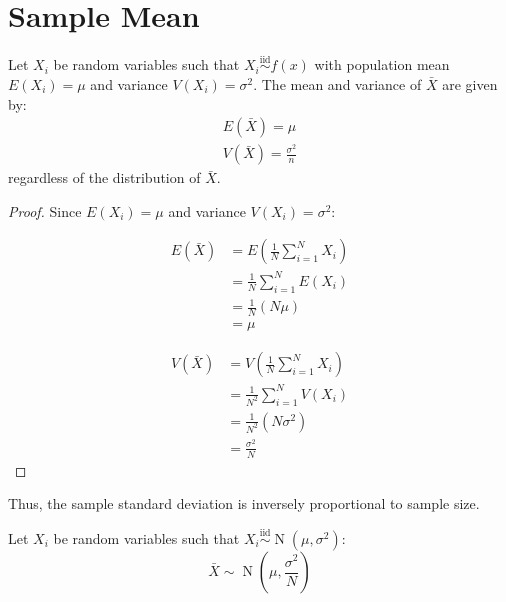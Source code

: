 \documentclass[letterpaper,12pt,fleqn]{article}
\newcommand{\iid}{\overset{\text{iid}}{\sim}}
\newcommand{\m}{\mu}
\renewcommand{\o}{\sigma}
\newcommand{\xb}{\bar{X}}
\DeclareMathOperator{\nd}{N}
\begin{document}
\section*{Sample Mean}

\begin{theorem}
  Let \(X_i\) be random variables such that \(X_i\iid f(x)\) with population mean \(E(X_i)=\m\) and variance \(V(X_i)=\o^2\).
  The mean and variance of \(\bar{X}\) are given by:
  \begin{gather*}
    E(\bar{X})=\m \\
    V(\bar{X})=\frac{\o^2}{n}
  \end{gather*}
  regardless of the distribution of \(\bar{X}\).
\end{theorem}

\begin{proof}
  Since \(E(X_i)=\m\) and variance \(V(X_i)=\o^2\):

  \begin{minipage}{3in}
    \begin{align*}
      E(\bar{X}) &= E\left(\frac{1}{N}\sum_{i=1}^NX_i\right) \\
      &= \frac{1}{N}\sum_{i=1}^NE(X_i) \\
      &= \frac{1}{N}(N\m) \\
      &= \m
    \end{align*}
  \end{minipage}
  \begin{minipage}{3in}
    \begin{align*}
      V(\bar{X}) &= V\left(\frac{1}{N}\sum_{i=1}^NX_i\right) \\
      &= \frac{1}{N^2}\sum_{i=1}^NV(X_i) \\
      &= \frac{1}{N^2}(N\o^2) \\
      &= \frac{\o^2}{N}
    \end{align*}
  \end{minipage}
\end{proof}

Thus, the sample standard deviation is inversely proportional to sample size.

\begin{theorem}
  Let \(X_i\) be random variables such that \(X_i\iid\nd(\m,\o^2)\):
  \[\xb\sim\nd\left(\m,\frac{\o^2}{N}\right)\]
\end{theorem}
\end{document}
